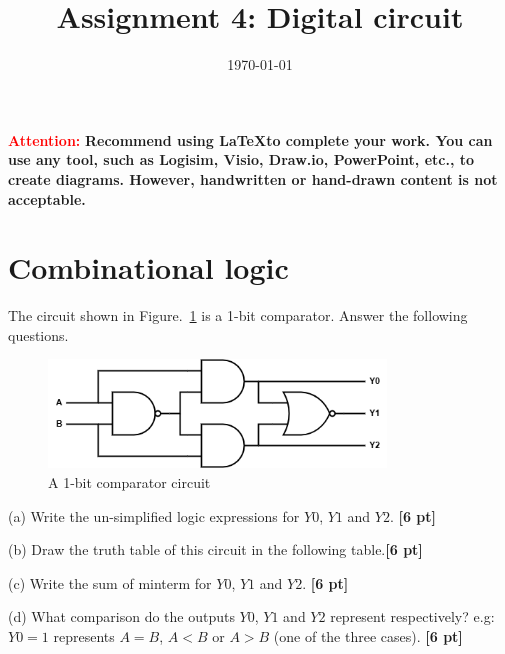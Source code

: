 \documentclass[a4paper]{article}
\date{\today}
\title{Assignment 4: Digital circuit}
\begin{document}
    \header{}
\textcolor{red}{\textbf{Attention: }}
\textbf{Recommend using \LaTeX \space to complete your work. You can use any tool, such as Logisim, Visio, Draw.io, PowerPoint, etc., to create diagrams. However, handwritten or hand-drawn content is not acceptable.}

\section{Combinational logic}
The circuit shown in Figure.~\ref{fig:Q1_circuit} is a 1-bit comparator. Answer the following questions. \\

\begin{figure}[htbp]
    \centering
    \includegraphics[width=0.8\textwidth]{Q1_circuit.png}
    \caption{A 1-bit comparator circuit}
    \label{fig:Q1_circuit}
\end{figure}

(a) Write the un-simplified logic expressions for $Y0$, $Y1$ and $Y2$. \textbf{[6 pt]}

(b) Draw the truth table of this circuit in the following table.\textbf{[6 pt]}

(c) Write the sum of minterm for $Y0$, $Y1$ and $Y2$. \textbf{[6 pt]}

(d) What comparison do the outputs $Y0$, $Y1$ and $Y2$ represent respectively? e.g: $Y0=1$ represents $A=B$, $A<B$ or $A>B$ (one of the three cases). \textbf{[6 pt]}
\end{document}
